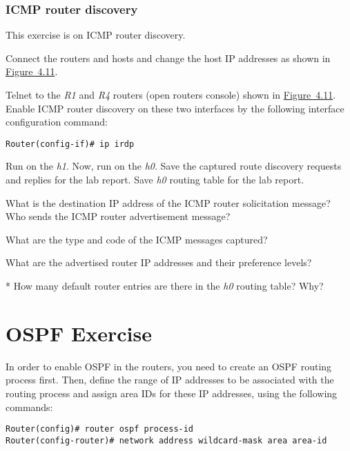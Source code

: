 \documentclass{../UTNetLab}
\begin{document}
\section{ICMP router discovery}\label{sec:ICMPRD}
This exercise is on ICMP router discovery.

Connect the routers and hosts and change the host IP addresses as shown in \hyperref[fig:4.11]{Figure~4.11}.

Telnet to the \textit{R1} and \textit{R4} routers (open routers console) shown in \hyperref[fig:4.11]{Figure~4.11}.
Enable ICMP router discovery on these two interfaces by the following interface configuration command:
\begin{lstlisting}[language={cisco}]
Router(config-if)# ip irdp
    \end{lstlisting}
Run  on the \textit{h1}.
Now, run  on the \textit{h0}.
Save the captured route discovery requests and replies for the lab report.
Save \textit{h0} routing table for the lab report.

\begin{report}
    \item What is the destination IP address of the ICMP router solicitation message? Who sends the ICMP router advertisement message?
    \item What are the type and code of the ICMP messages captured?
    \item What are the advertised router IP addresses and their preference levels?
    \item [*] How many default router entries are there in the \textit{h0} routing table? Why?
\end{report}

\part{OSPF Exercise}\label{sec:ospf}
In order to enable OSPF in the routers, you need to create an OSPF routing process first.
Then, define the range of IP addresses to be associated with the routing process and assign area IDs for these IP addresses, using the following commands:
\begin{lstlisting}[language={cisco}, emph={process-id, area-id, address, wildcard-mask}]
Router(config)# router ospf process-id
Router(config-router)# network address wildcard-mask area area-id
    \end{lstlisting}
\end{document}
